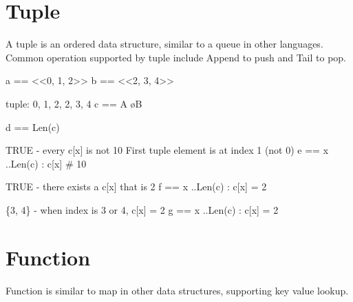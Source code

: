 \section{Tuple}

A tuple is an ordered data structure, similar to a queue in other languages.
Common operation supported by tuple include Append to push and Tail to pop.
\newline

\begin{tla}
a == <<0, 1, 2>>                    
b == <<2, 3, 4>>

\* tuple: 0, 1, 2, 2, 3, 4
c == A \o B

d == Len(c)                         

\* TRUE - every c[x] is not 10
\* First tuple element is at index 1 (not 0)
e == \A x ..Len(c) : c[x] # 10 

\* TRUE - there exists a c[x] that is 2
f == \E x ..Len(c) : c[x] = 2

\* \{3, 4\} - when index is 3 or 4, c[x] = 2
g == {x ..Len(c) : c[x] = 2}   
\end{tla}
\begin{tlatex}
%
%
\@pvspace{8.0pt}%
\@x{}%
%
\@xx{}%
%
\@pvspace{8.0pt}%
\@x{}%
%
\@xx{}%
%
\@pvspace{8.0pt}%
\@x{}%
%
\@xx{}%
\@x{}%
%
\@xx{}%
\@pvspace{8.0pt}%
\@x{}%
%
\@xx{}%
\@pvspace{8.0pt}%
\@x{}%
%
\@xx{}%
\end{tlatex}

\section{Function}

Function is similar to map in other data structures, supporting key value
lookup.\\

